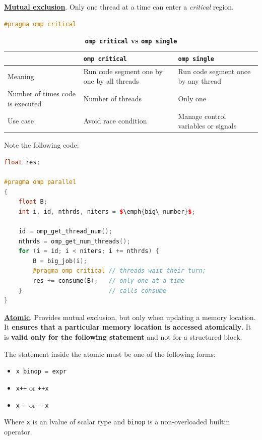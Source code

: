 \highspace
\textbf{\underline{Mutual exclusion}}. Only one thread at a time can enter a \emph{critical} region.
\begin{openmpbox}
    \begin{lstlisting}[language=C++]
#pragma omp critical\end{lstlisting}
\end{openmpbox}
\begin{table}[!htp]
    \centering
    \begin{tabular}{@{} p{8em} | p{12em} | p{12em} @{}}
        \toprule
        & \texttt{omp critical} & \texttt{omp single} \\
        \midrule
        Meaning & Run code segment one by one by all threads & Run code segment once by any thread \\
        \cmidrule{1-3}
        Number of times code is executed & Number of threads & Only one \\
        \cmidrule{1-3}
        Use case & Avoid race condition & Manage control variables or signals \\
        \bottomrule
    \end{tabular}
    \caption{\textcolor{Red2}{ \textbf{\texttt{omp critical} vs \texttt{omp single}}}}
\end{table}
\begin{examplebox}
    Note the following code:
    \begin{lstlisting}[language=C++, mathescape=true]
float res;

#pragma omp parallel
{
    float B;
    int i, id, nthrds, niters = $\emph{big\_number}$;

    id = omp_get_thread_num();
    nthrds = omp_get_num_threads();
    for (i = id; i < niters; i += nthrds) {
        B = big_job(i);
        #pragma omp critical // threads wait their turn;
        res += consume(B);   // only one at a time
    }                        // calls consume
}
    \end{lstlisting}
\end{examplebox}

\highspace
\textbf{\underline{Atomic}}. Provides mutual exclusion, but only when updating a memory location. It \textbf{ensures that a particular memory location is accessed atomically}. It is \textbf{valid only for the following statement} and not for a structured block.

\highspace
The statement inside the atomic must be one of the following forms:
\begin{itemize}
    \item \texttt{x binop = expr}
    \item \texttt{x++} or \texttt{++x}
    \item \texttt{x-}\texttt{-} or \texttt{-}\texttt{-x}
\end{itemize}
Where \texttt{x} is an lvalue of scalar type and \texttt{binop} is a non-overloaded builtin operator.

